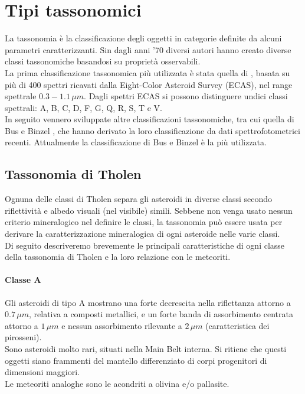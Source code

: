 \documentclass[a4paper,11pt,openright]{book}
\begin{document}
\section{Tipi tassonomici}
La tassonomia è la classificazione degli oggetti in categorie definite da alcuni parametri caratterizzanti. Sin dagli anni '70 diversi autori hanno creato diverse classi tassonomiche basandosi su proprietà osservabili.\\
La prima classificazione tassonomica più utilizzata è stata quella di \citet{tholen_asteroid_1984}, basata su più di 400 spettri ricavati dalla Eight-Color Asteroid Survey (ECAS), nel range spettrale $0.3-1.1\,\mu m$. Dagli spettri ECAS si possono distinguere undici classi spettrali: A, B, C, D, F, G, Q, R, S, T e V.\\
In seguito vennero sviluppate altre classificazioni tassonomiche, tra cui quella di Bus e Binzel \citep{bus_phase_2002-1, bus_phase_2002}, che hanno derivato la loro classificazione da dati spettrofotometrici recenti. Attualmente la classificazione di Bus e Binzel è la più utilizzata.

\subsection{Tassonomia di Tholen}
Ognuna delle classi di Tholen separa gli asteroidi in diverse classi secondo riflettività e albedo visuali (nel visibile) simili. Sebbene non venga usato nessun criterio mineralogico nel definire le classi, la tassonomia può essere usata per derivare la caratterizzazione mineralogica di ogni asteroide nelle varie classi.\\
Di seguito descriveremo brevemente le principali caratteristiche di ogni classe della tassonomia di Tholen e la loro relazione con le meteoriti. 

\paragraph*{Classe A}
Gli asteroidi di tipo A mostrano una forte decrescita nella riflettanza attorno a $0.7\,\mu m$, relativa a composti metallici, e un forte banda di assorbimento centrata attorno a $1\,\mu m$ e nessun assorbimento rilevante a $2\,\mu m$ (caratteristica dei pirosseni).\\
Sono asteroidi molto rari, situati nella Main Belt interna. Si ritiene che questi oggetti siano frammenti del mantello differenziato di corpi progenitori di dimensioni maggiori.\\
Le meteoriti analoghe sono le acondriti a olivina e/o pallasite.
\end{document}
